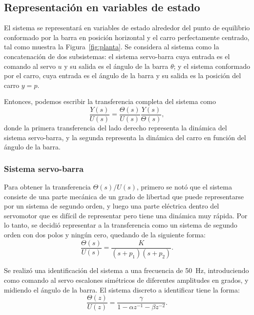 \subsection{Representación en variables de estado}

El sistema se representará en variables de estado alrededor del punto de equilibrio conformado por la barra en posición horizontal y el carro perfectamente centrado, tal como muestra la Figura~\ref{fig:planta}. Se considera al sistema como la concatenación de dos subsistemas: el sistema servo-barra cuya entrada es el comando al servo $u$ y su salida es el ángulo de la barra $\theta$; y el sistema conformado por el carro, cuya entrada es el ángulo de la barra y su salida es la posición del carro $y = p$.

Entonces, podemos escribir la transferencia completa del sistema como
\[
    \frac{Y(s)}{U(s)} = \frac{\Theta(s)}{U(s)} \frac{Y(s)}{\Theta(s)},
\]
donde la primera transferencia del lado derecho representa la dinámica del sistema servo-barra, y la segunda representa la dinámica del carro en función del ángulo de la barra.

\subsubsection{Sistema servo-barra}

Para obtener la transferencia $\Theta(s) / U(s)$, primero se notó que el sistema consiste de una parte mecánica de un grado de libertad que puede representarse por un sistema de segundo orden, y luego una parte eléctrica dentro del servomotor que es difícil de representar pero tiene una dinámica muy rápida. Por lo tanto, se decidió representar a la transferencia como un sistema de segundo orden con dos polos y ningún cero, quedando de la siguiente forma:
\[
    \frac{\Theta(s)}{U(s)} = \frac{K}{(s+p_1)(s+p_2)}.
\]

Se realizó una identificación del sistema a una frecuencia de \qty{50}{\Hz}, introduciendo como comando al servo escalones simétricos de diferentes amplitudes en grados, y midiendo el ángulo de la barra. El sistema discreto a identificar tiene la forma:
\[
    \frac{\Theta(z)}{U(z)} = \frac{\gamma}{1 - \alpha z^{-1} - \beta z^{-2}}.
\]

